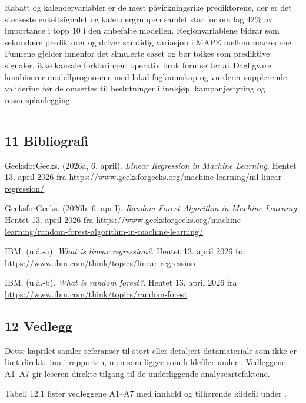 \documentclass[
  11pt,
]{article}
\newcommand{\splitcode}[1]{{\ttfamily\seqsplit{#1}}}
\begin{document}
Rabatt og kalendervariabler er de mest påvirkningsrike prediktorene, der \splitcode{Discount} er det sterkeste
enkeltsignalet og kalendergruppen samlet står for om lag \(42\%\) av importance i topp 10 i den anbefalte modellen.
Regionvariablene bidrar som sekundære prediktorer og driver samtidig variasjon i MAPE mellom markedene. Funnene gjelder
innenfor det simulerte caset og bør tolkes som prediktive signaler, ikke kausale forklaringer; operativ bruk forutsetter
at Dagligvare kombinerer modellprognosene med lokal fagkunnskap og vurderer supplerende validering før de omsettes til
beslutninger i innkjøp, kampanjestyring og ressursplanlegging.

\begin{center}\rule{0.5\linewidth}{0.5pt}\end{center}

\hypertarget{bibliografi}{%
\subsection{11 Bibliografi}\label{bibliografi}}

GeeksforGeeks. (2026a, 6. april). \emph{Linear Regression in Machine Learning}. Hentet 13. april 2026 fra
\url{https://www.geeksforgeeks.org/machine-learning/ml-linear-regression/}

GeeksforGeeks. (2026b, 6. april). \emph{Random Forest Algorithm in Machine Learning}. Hentet 13. april 2026 fra
\url{https://www.geeksforgeeks.org/machine-learning/random-forest-algorithm-in-machine-learning/}

IBM. (u.å.-a). \emph{What is linear regression?}. Hentet 13. april 2026 fra
\url{https://www.ibm.com/think/topics/linear-regression}

IBM. (u.å.-b). \emph{What is random forest?}. Hentet 13. april 2026 fra
\url{https://www.ibm.com/think/topics/random-forest}

\hypertarget{vedlegg}{%
\subsection{12 Vedlegg}\label{vedlegg}}

Dette kapitlet samler referanser til stort eller detaljert datamateriale som ikke er limt direkte inn i rapporten, men
som ligger som kildefiler under \splitcode{006 analysis/}. Vedleggene A1--A7 gir leseren direkte tilgang til de
underliggende analyseartefaktene.

Tabell 12.1 lister vedleggene A1--A7 med innhold og tilhørende kildefil under \splitcode{006 analysis/}.
\end{document}
